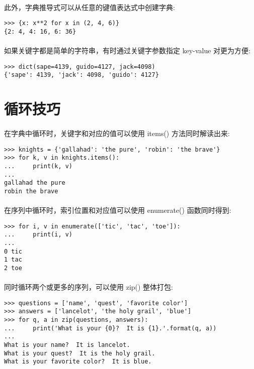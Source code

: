 \documentclass{article}
\begin{document}
\begin{CJK}{UTF8}{gbsn}
\paragraph{}
此外，字典推导式可以从任意的键值表达式中创建字典:
\begin{verbatim}
>>> {x: x**2 for x in (2, 4, 6)}
{2: 4, 4: 16, 6: 36}
\end{verbatim}
\paragraph{}
如果关键字都是简单的字符串，有时通过关键字参数指定 key-value 对更为方便:
\begin{verbatim}
>>> dict(sape=4139, guido=4127, jack=4098)
{'sape': 4139, 'jack': 4098, 'guido': 4127}
\end{verbatim}
\section{循环技巧}
\paragraph{}
在字典中循环时，关键字和对应的值可以使用 items() 方法同时解读出来:
\begin{verbatim}
>>> knights = {'gallahad': 'the pure', 'robin': 'the brave'}
>>> for k, v in knights.items():
...     print(k, v)
...
gallahad the pure
robin the brave
\end{verbatim}
\paragraph{}
在序列中循环时，索引位置和对应值可以使用 enumerate() 函数同时得到:
\begin{verbatim}
>>> for i, v in enumerate(['tic', 'tac', 'toe']):
...     print(i, v)
...
0 tic
1 tac
2 toe
\end{verbatim}
\paragraph{}
同时循环两个或更多的序列，可以使用 zip() 整体打包:
\begin{verbatim}
>>> questions = ['name', 'quest', 'favorite color']
>>> answers = ['lancelot', 'the holy grail', 'blue']
>>> for q, a in zip(questions, answers):
...     print('What is your {0}?  It is {1}.'.format(q, a))
...
What is your name?  It is lancelot.
What is your quest?  It is the holy grail.
What is your favorite color?  It is blue.
\end{verbatim}

\end{CJK}
\end{document}
